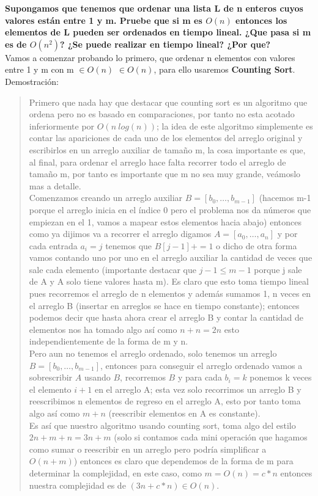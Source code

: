 \textbf{Supongamos que tenemos que ordenar una lista L de n enteros cuyos valores están entre 1 y m. Pruebe que si m es $O(n)$ entonces los elementos de L pueden ser ordenados en tiempo lineal. ¿Que pasa si m es de $O(n^2)$? ¿Se puede realizar en tiempo lineal? ¿Por que?}\\

Vamos a comenzar probando lo primero, que ordenar n elementos con valores entre 1 y m con m $\in O(n)$ $\in O(n)$, para ello usaremos \textbf{Counting Sort}.\\

\textcolor{bibi}{Demostración:}
\begin{quote}
    Primero que nada hay que destacar que counting sort es un algoritmo que ordena pero no es basado en comparaciones, por tanto no esta acotado inferiormente por $O(n \ log(n))$; la idea de este algoritmo simplemente es contar las apariciones de cada uno de los elementos del arreglo original y escribirlos en un arreglo auxiliar de tamaño m, la cosa importante es que, al final, para ordenar el arreglo hace falta recorrer todo el arreglo de tamaño m, por tanto es importante que m no sea muy grande, veámoslo mas a detalle.\\

    Comenzamos creando un arreglo auxiliar $B=[b_0,\dots,b_{m-1}]$ (hacemos m-1 porque el arreglo inicia en el índice 0 pero el problema nos da números que empiezan en el 1, vamos a mapear estos elementos hacia abajo) entonces como ya dijimos va a recorrer el arreglo digamos $A=[a_0,\dots,a_n]$ y por cada entrada $a_{i}=j$ tenemos que $B[j-1]+=1$ o dicho de otra forma vamos contando uno por uno en el arreglo auxiliar la cantidad de veces que sale cada elemento (importante destacar que $j-1 \leq m-1$ porque j sale de A y A solo tiene valores hasta m). Es claro que esto toma tiempo lineal pues recorremos el arreglo de n elementos y además sumamos 1, n veces en el arreglo B (insertar en arreglos se hace en tiempo constante); entonces podemos decir que hasta ahora crear el arreglo B y contar la cantidad de elementos nos ha tomado algo así como $n+n=2n$ esto independientemente de la forma de m y n.\\

    Pero aun no tenemos el arreglo ordenado, solo tenemos un arreglo $B=[b_0,\dots,b_{m-1}]$, entonces para conseguir el arreglo ordenado vamos a sobrescribir $A$ usando $B$, recorremos $B$ y para cada $b_i=k$ ponemos k veces el elemento $i+1$ en el arreglo A; esta vez solo recorrimos un arreglo B y reescribimos n elementos de regreso en el arreglo A, esto por tanto toma algo así como $m+n$ (reescribir elementos en A es constante).\\

    Es así que nuestro algoritmo usando counting sort, toma algo del estilo $2n+m+n=3n+m$ (solo si contamos cada mini operación que hagamos como sumar o reescribir en un arreglo pero podría simplificar a $O(n+m)$) entonces es claro que dependemos de la forma de m para determinar la complejidad, en este caso, como $m = O(n) = c*n$ entonces nuestra complejidad es de $(3n+c*n) \in O(n)$.
\end{quote}

